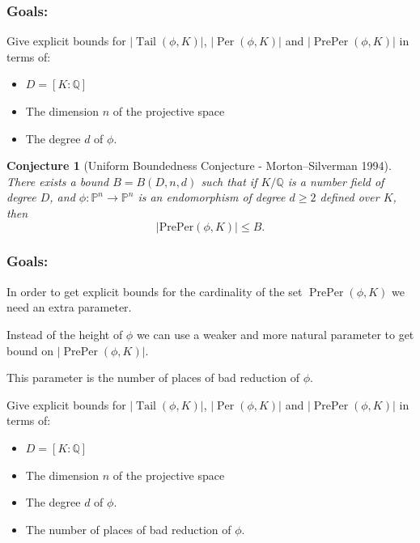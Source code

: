 \documentclass{beamer}
\def\QQ{{\mathbb Q}}
\DeclareMathOperator{\Tail}{Tail}
\DeclareMathOperator{\Per}{Per}
\DeclareMathOperator{\PrePer}{PrePer}
\theoremstyle{thmstyle}
\theoremstyle{thmstyle}
\theoremstyle{mystyle}
\newtheorem*{conjecture}{Conjecture}
\theoremstyle{qstnstyle}
\begin{document}
\begin{frame}
\frametitle{Goals:}
Give explicit bounds for $|\Tail(\phi,K)|$, $|\Per(\phi,K)|$ and $|\PrePer(\phi,K)|$ in terms of: 
\begin{itemize}
\item  $D=[K: \QQ]$  

\item The dimension $n$ of the projective space   

\item The degree $d$ of $\phi$.
\end{itemize}

 

\begin{conjecture}[Uniform Boundedness Conjecture - Morton--Silverman
  1994]
There exists a bound $B = B(D,n,d)$ such that if $K/\mathbb{Q}$ is a number field of degree $D$, and $\phi:\mathbb{P}^n\rightarrow\mathbb{P}^n$ is an endomorphism of degree $d\geq{2}$ defined over $K$, then 
$$|\text{PrePer}(\phi,K)| \leq B.$$
\end{conjecture}
\end{frame}

\begin{frame}
\frametitle{Goals:}

In order to get explicit bounds for the cardinality of the set $\PrePer(\phi,K)$ we need an extra parameter. 

Instead of the height of $\phi$ we can use a weaker and more natural parameter to get bound on $|\PrePer(\phi,K)|$.  

This parameter is the number of places of bad reduction of $\phi$.




Give explicit bounds for $|\Tail(\phi,K)|$, $|\Per(\phi,K)|$ and $|\PrePer(\phi,K)|$ in terms of:
\begin{itemize}
\item  $D=[K: \QQ]$ 

\item The dimension $n$ of the projective space  

\item The degree $d$ of $\phi$.

\item The number of places of bad reduction of $\phi$.
\end{itemize}


\end{frame}
\end{document}
